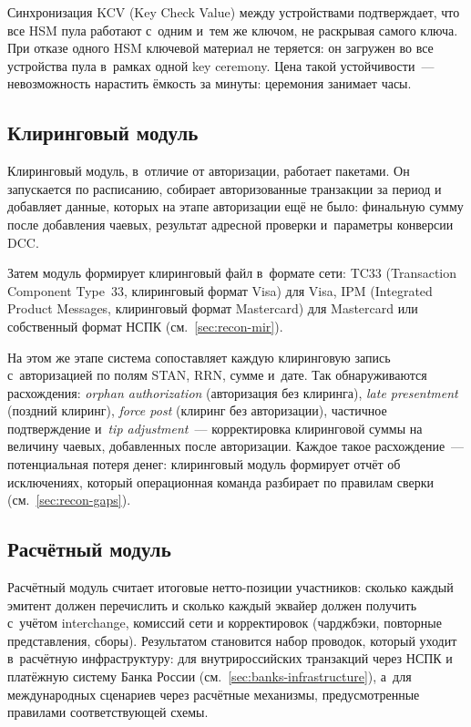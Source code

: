 
Синхронизация KCV (Key Check Value) между устройствами подтверждает,
что все HSM пула работают с~одним и~тем же ключом, не раскрывая
самого ключа. При отказе одного HSM ключевой материал не теряется:
он загружен во все устройства пула в~рамках одной key ceremony. Цена
такой устойчивости~--- невозможность нарастить ёмкость за минуты:
церемония занимает часы.

\subsection*{Клиринговый модуль}

Клиринговый модуль, в~отличие от авторизации, работает
пакетами. Он запускается по расписанию, собирает
авторизованные транзакции за период и добавляет данные,
которых на этапе авторизации ещё не было: финальную сумму
после добавления чаевых, результат адресной проверки
и~параметры конверсии DCC.

Затем модуль формирует клиринговый файл в~формате сети:
TC33 (Transaction Component Type~33, клиринговый формат Visa) для Visa, IPM (Integrated Product Messages, клиринговый формат Mastercard) для Mastercard
или собственный формат НСПК (см.~\autoref{sec:recon-mir}).~\cite{visa-core-rules,mc-tpr,nspk-mir-rules}

На этом же этапе система сопоставляет каждую клиринговую
запись с~авторизацией по полям STAN, RRN, сумме
и~дате. Так обнаруживаются расхождения: \textit{orphan authorization}
(авторизация без клиринга), \textit{late presentment} (поздний клиринг),
\textit{force post} (клиринг без авторизации), частичное подтверждение
и~\textit{tip adjustment}~--- корректировка клиринговой суммы на
величину чаевых, добавленных после авторизации. Каждое такое
расхождение~--- потенциальная потеря денег: клиринговый модуль
формирует отчёт об исключениях, который операционная команда
разбирает по правилам сверки (см.~\ref{sec:recon-gaps}).

\subsection*{Расчётный модуль}

Расчётный модуль считает итоговые нетто-позиции участников:
сколько каждый эмитент должен перечислить и сколько каждый
эквайер должен получить с~учётом interchange, комиссий сети
и корректировок (чарджбэки, повторные представления, сборы).
Результатом становится набор проводок, который уходит
в~расчётную инфраструктуру: для внутрироссийских транзакций
через НСПК и платёжную систему Банка России
(см.~\autoref{sec:banks-infrastructure}), а~для международных сценариев
через расчётные механизмы, предусмотренные правилами
соответствующей
схемы.~\cite{cbr-ps,visa-core-rules,mc-switching-services}

